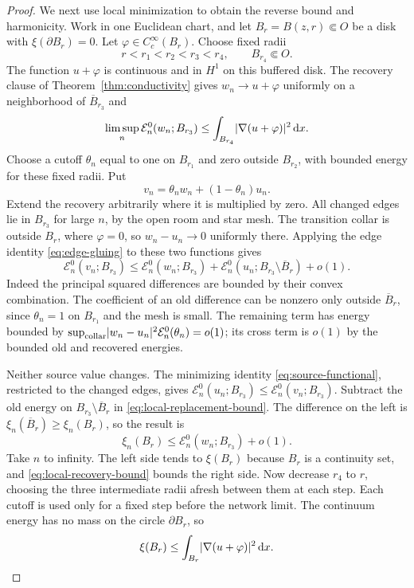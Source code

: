 \begin{proof}
We next use local minimization to obtain the reverse bound and harmonicity.
Work in one Euclidean chart, and let \(B_r=B(z,r)\Subset O\) be a disk
with \(\xi(\partial B_r)=0\).  Let
\(\varphi\in C_c^\infty(B_r)\).  Choose fixed radii
\[
             r<r_1<r_2<r_3<r_4,\qquad B_{r_4}\Subset O.
\]
The function \(u+\varphi\) is continuous and in \(H^1\) on this
buffered disk.  The recovery clause of
Theorem~\ref{thm:conductivity} gives \(w_n\to u+\varphi\) uniformly on a
neighborhood of \(\overline B_{r_3}\) and
\begin{equation}\label{eq:local-recovery-bound}
 \limsup_n\mathcal E_n^0(w_n;B_{r_3})
 \le\int_{B_{r_4}}\lvert \nabla(u+\varphi)\rvert^2\,\mathrm d x.
\end{equation}
Choose a cutoff \(\theta_n\) equal to one on \(B_{r_1}\) and zero outside
\(B_{r_2}\), with bounded energy for these fixed radii.  Put
\[
                 v_n=\theta_n w_n+(1-\theta_n)u_n.
\]
Extend the recovery arbitrarily where it is multiplied by zero.
All changed edges lie in \(B_{r_3}\) for large \(n\), by the open room
and star mesh.  The transition collar is outside \(B_r\), where
\(\varphi=0\), so \(w_n-u_n\to0\) uniformly there.  Applying the
edge identity \eqref{eq:edge-gluing} to these two functions gives
\begin{equation}\label{eq:local-replacement-bound}
 \mathcal E_n^0(v_n;B_{r_3})
 \le \mathcal E_n^0(w_n;B_{r_3})
       +\mathcal E_n^0(u_n;B_{r_3}\setminus\overline B_r)+o(1).
\end{equation}
Indeed the principal squared differences are bounded by their convex
combination.  The coefficient of an old difference can be nonzero only
outside \(\overline B_r\), since \(\theta_n=1\) on \(B_{r_1}\) and
the mesh is small.  The remaining term has energy bounded by
\(\sup_{\rm collar}\lvert w_n-u_n\rvert^2\mathcal E_n^0(\theta_n)=o(1)\);
its cross term is \(o(1)\) by the bounded old and recovered energies.

Neither source value changes.  The minimizing identity
\eqref{eq:source-functional}, restricted to the changed edges, gives
\(\mathcal E_n^0(u_n;B_{r_3})
 \le\mathcal E_n^0(v_n;B_{r_3})\).
Subtract the old energy on
\(B_{r_3}\setminus\overline B_r\) in
\eqref{eq:local-replacement-bound}.  The difference on the left is
\(\xi_n(\overline B_r)\ge\xi_n(B_r)\), so the result is
\[
                \xi_n(B_r)
                \le\mathcal E_n^0(w_n;B_{r_3})+o(1).
\]
Take \(n\) to infinity.  The left side tends to \(\xi(B_r)\) because
\(B_r\) is a continuity set, and
\eqref{eq:local-recovery-bound} bounds the right side.  Now decrease
\(r_4\) to \(r\), choosing the three intermediate radii afresh between
them at each step.  Each cutoff is used only for a fixed step before
the network limit.  The continuum energy has no mass on the circle
\(\partial B_r\), so
\begin{equation}\label{eq:local-minimality-limit}
       \xi(B_r)\le
         \int_{B_r}\lvert \nabla(u+\varphi)\rvert^2\,\mathrm d x.
\end{equation}


\end{proof}
